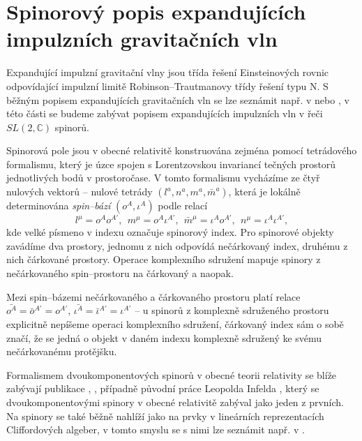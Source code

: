 \chapter{Spinorový popis expandujících impulzních gravitačních vln}
\label{chap:kap04}
Expandující impulzní gravitační vlny jsou třída řešení Einsteinových rovnic odpovídající impulzní limitě
Robinson--Trautmanovy třídy řešení typu N. S běžným popisem expandujících gravitačních vln se lze seznámit např. v
\cite{Podolsky_1999} nebo \cite{Podolsky:2016mqg}, v této části se budeme zabývat
popisem expandujících impulzních vln v řeči $SL(2, \mathbb{C})$ spinorů.

Spinorová pole jsou v obecné relativitě konstruována zejména pomocí tetrádového formalismu,
který je úzce spojen s Lorentzovskou invariancí tečných prostorů jednotlivých bodů v prostoročase.
V tomto formalismu vycházíme ze čtyř nulových vektorů -- nulové tetrády $(l^a, n^a, m^a, \bar{m}^a)$,
která je lokálně determinována \emph{spin--bází} $(o^A, \iota^A)$ podle relací
\begin{equation}
    \label{eq:tetrad-spinor-basis-relation}
    l^\mu = o^A o^{A'}, ~~ m^\mu = o^A \iota^{A'}, ~~ \bar{m}^\mu = \iota^A o^{A'}, ~~ n^\mu = \iota^A \iota^{A'},
\end{equation}
kde velké písmeno v indexu označuje spinorový index. Pro spinorové objekty zavádíme dva prostory,
jednomu z nich odpovídá nečárkovaný index, druhému z nich čárkované prostory. Operace komplexního sdružení
mapuje spinory z nečárkovaného spin--prostoru na čárkovaný a naopak.

Mezi spin--bázemi nečárkovaného a čárkovaného prostoru platí relace $\bar{o^A} = \bar{o}^{A'} = o^{A'}$, $\bar{\iota^A} = \bar{\iota}^{A'} = \iota^{A'}$ --
u spinorů z komplexně sdruženého prostoru explicitně nepíšeme operaci komplexního sdružení, čárkovaný index sám o sobě značí,
že se jedná o objekt v daném indexu komplexně sdružený ke svému nečárkovanému protějšku.

Formalismem dvoukomponentových spinorů v obecné teorii relativity se blíže zabývají publikace
\cite{penrose_rindler_1984}, \cite{doi:10.1142/5222}, případně původní práce Leopolda Infelda \cite{zbMATH03005509},
který se dvoukomponentovými spinory v obecné relativitě zabýval jako jeden z prvních. Na spinory se také běžně
nahlíží jako na prvky v lineárních reprezentacích Cliffordových algeber, v tomto smyslu se s nimi lze seznámit např. v \cite{fecko_2006}.


